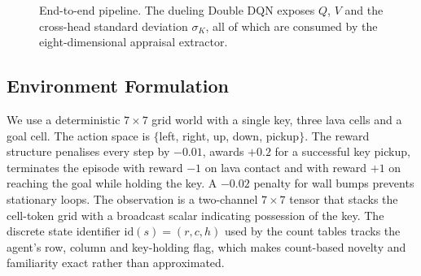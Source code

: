\documentclass[conference]{IEEEtran}
\begin{document}
\begin{figure}[!t]
\centering
{}
\caption{End-to-end pipeline. The dueling Double DQN exposes
$Q$, $V$ and the cross-head standard deviation $\sigma_K$, all of
which are consumed by the eight-dimensional appraisal extractor.}
\label{fig:pipeline}
\end{figure}

\subsection{Environment Formulation}
We use a deterministic $7{\times}7$ grid world with a single key, three lava
cells and a goal cell. The action space is $\{$left, right, up, down,
pickup$\}$. The reward structure penalises every step by $-0.01$, awards
$+0.2$ for a successful key pickup, terminates the episode with reward $-1$
on lava contact and with reward $+1$ on reaching the goal while holding the
key. A $-0.02$ penalty for wall bumps prevents stationary loops. The
observation is a two-channel $7{\times}7$ tensor that stacks the cell-token
grid with a broadcast scalar indicating possession of the key. The discrete
state identifier $\mathrm{id}(s) = (r, c, h)$ used by the count tables tracks
the agent's row, column and key-holding flag, which makes count-based novelty
and familiarity exact rather than approximated.
\end{document}

